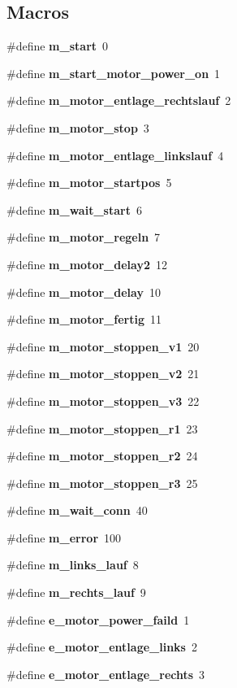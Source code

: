 \subsection*{Macros}
\begin{DoxyCompactItemize}
\item 
\#define \textbf{ m\+\_\+start}~0
\item 
\#define \textbf{ m\+\_\+start\+\_\+motor\+\_\+power\+\_\+on}~1
\item 
\#define \textbf{ m\+\_\+motor\+\_\+entlage\+\_\+rechtslauf}~2
\item 
\#define \textbf{ m\+\_\+motor\+\_\+stop}~3
\item 
\#define \textbf{ m\+\_\+motor\+\_\+entlage\+\_\+linkslauf}~4
\item 
\#define \textbf{ m\+\_\+motor\+\_\+startpos}~5
\item 
\#define \textbf{ m\+\_\+wait\+\_\+start}~6
\item 
\#define \textbf{ m\+\_\+motor\+\_\+regeln}~7
\item 
\#define \textbf{ m\+\_\+motor\+\_\+delay2}~12
\item 
\#define \textbf{ m\+\_\+motor\+\_\+delay}~10
\item 
\#define \textbf{ m\+\_\+motor\+\_\+fertig}~11
\item 
\#define \textbf{ m\+\_\+motor\+\_\+stoppen\+\_\+v1}~20
\item 
\#define \textbf{ m\+\_\+motor\+\_\+stoppen\+\_\+v2}~21
\item 
\#define \textbf{ m\+\_\+motor\+\_\+stoppen\+\_\+v3}~22
\item 
\#define \textbf{ m\+\_\+motor\+\_\+stoppen\+\_\+r1}~23
\item 
\#define \textbf{ m\+\_\+motor\+\_\+stoppen\+\_\+r2}~24
\item 
\#define \textbf{ m\+\_\+motor\+\_\+stoppen\+\_\+r3}~25
\item 
\#define \textbf{ m\+\_\+wait\+\_\+conn}~40
\item 
\#define \textbf{ m\+\_\+error}~100
\item 
\#define \textbf{ m\+\_\+links\+\_\+lauf}~8
\item 
\#define \textbf{ m\+\_\+rechts\+\_\+lauf}~9
\item 
\#define \textbf{ e\+\_\+motor\+\_\+power\+\_\+faild}~1
\item 
\#define \textbf{ e\+\_\+motor\+\_\+entlage\+\_\+links}~2
\item 
\#define \textbf{ e\+\_\+motor\+\_\+entlage\+\_\+rechts}~3
\item 

\end{DoxyCompactItemize}
